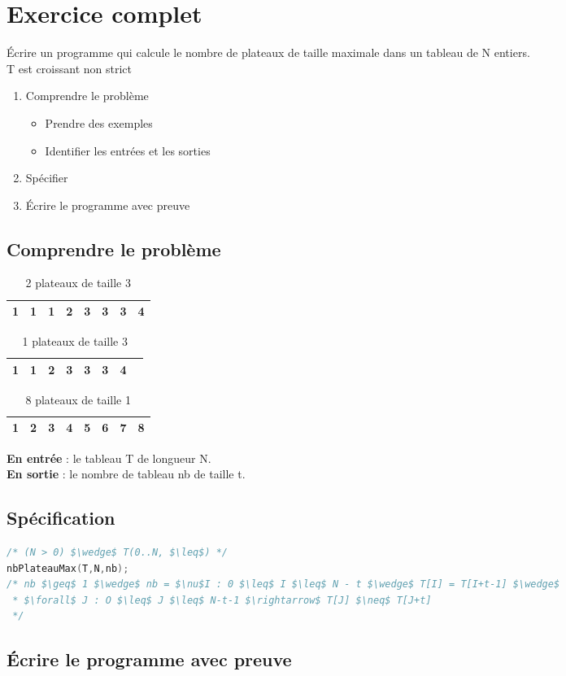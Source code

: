 \section{Exercice complet}
\'Ecrire un programme qui calcule le nombre de plateaux de taille maximale dans un tableau de N entiers.\\
 T est croissant non strict
 \begin{enumerate}
	 \item Comprendre le problème
		 \begin{itemize}
			 \item Prendre des exemples
			 \item Identifier les entrées et les sorties
		 \end{itemize}
	 \item Spécifier 
	 \item \'Ecrire le programme avec preuve
 \end{enumerate}
 \subsection{Comprendre le problème}
 \begin{table}[H]
	 \centering
	 \begin{tabular}{|c|c|c|c|c|c|c|c|}
		 \hline
		 1&1&1&2&3&3&3&4\\
		 \hline
	 \end{tabular}
	 \caption{2 plateaux de taille 3}
 \end{table}
 \begin{table}[H]
	 \centering
	 \begin{tabular}{|c|c|c|c|c|c|c|c|}
		 \hline
		 1&1&2&3&3&3&4\\
		 \hline
	 \end{tabular}
	 \caption{1 plateaux de taille 3}
 \end{table}
 \begin{table}[H]
	 \centering
	 \begin{tabular}{|c|c|c|c|c|c|c|c|}
		 \hline
		 1&2&3&4&5&6&7&8\\
		 \hline
	 \end{tabular}
	 \caption{8 plateaux de taille 1}
 \end{table}
 \textbf{En entrée} : le tableau T de longueur N.\\
 \textbf{En sortie} : le nombre de tableau nb de taille t.
 \subsection{Spécification}
 \begin{lstlisting}[language=C]
/* (N > 0) $\wedge$ T(0..N, $\leq$) */
nbPlateauMax(T,N,nb);
/* nb $\geq$ 1 $\wedge$ nb = $\nu$I : 0 $\leq$ I $\leq$ N - t $\wedge$ T[I] = T[I+t-1] $\wedge$ 
 * $\forall$ J : O $\leq$ J $\leq$ N-t-1 $\rightarrow$ T[J] $\neq$ T[J+t] 
 */ 
 \end{lstlisting}
 \subsection{\'Ecrire le programme avec preuve}
 
